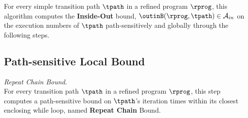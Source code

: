 For every simple transition path $\tpath$ in a refined program $\rprog$, 
this algorithm
computes the \textbf{Inside-Out} bound, $\outinB(\rprog, \tpath) \in \mathcal{A}_{in}$
on the execution numbers of $\tpath$ path-sensitively and globally
through the following steps.

\subsection{Path-sensitive Local Bound}
%
\emph{Repeat Chain Bound}.
  \\
  For every transition path $\tpath$ in a refined program $\rprog$,
  this step computes a path-sensitive
  bound on $\tpath$'s iteration times within its closest enclosing while loop, named \textbf{Repeat Chain} Bound.

